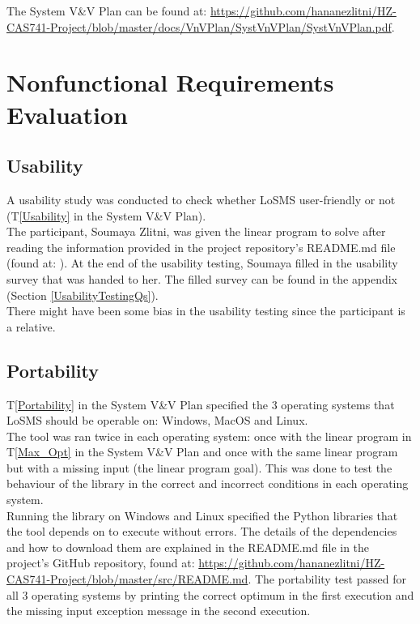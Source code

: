 \documentclass[12pt, titlepage]{article}
\newcommand{\famname}{LoSMS}
\begin{document}
The System V\&V Plan can be found at: 
\url{https://github.com/hananezlitni/HZ-CAS741-Project/blob/master/docs/VnVPlan/SystVnVPlan/SystVnVPlan.pdf}.

\section{Nonfunctional Requirements Evaluation} \label{NonFuncReqsEval}

\subsection{Usability}

A usability study was conducted to check whether \famname{} user-friendly or 
not (T\ref{Usability} in the System V\&V Plan). \\

The participant, Soumaya Zlitni, was given the linear program to solve after 
reading the information provided in the project repository's README.md file 
(found at: 
).
 At the end of the usability testing, Soumaya filled in the usability survey 
 that was handed to her. The filled survey can be found in the appendix 
 (Section \ref{UsabilityTestingQs}). \\
 
 There might have been some bias in the usability testing since the participant 
 is a relative.
		
\subsection{Portability}

T\ref{Portability} in the System V\&V Plan specified the 3 operating systems 
that \famname{} should be operable on: Windows, MacOS and Linux. \\

The tool was ran twice in each operating system: once with the linear program 
in T\ref{Max_Opt} in the System V\&V Plan and once with the same linear program 
but with a missing input (the linear program goal). This was done to test the 
behaviour of the library in the correct and incorrect conditions in each 
operating system. \\

Running the library on Windows and Linux specified the Python libraries that 
the tool depends on to execute without errors. The details of the dependencies 
and how to download them are explained in the README.md file in the project's 
GitHub repository, found at: 
\url{https://github.com/hananezlitni/HZ-CAS741-Project/blob/master/src/README.md}.
 The portability test passed for all 3 
operating systems by printing the correct optimum in the first execution and 
the missing input exception message in the second execution. \\
\end{document}
